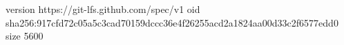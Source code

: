 version https://git-lfs.github.com/spec/v1
oid sha256:917cfd72c05a5c3cad70159dccc36e4f26255acd2a1824aa00d33c2f6577edd0
size 5600
